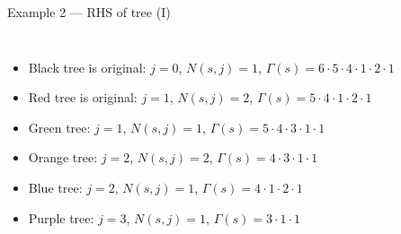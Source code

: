 \documentclass[serif]{beamer}
\begin{document}
\begin{frame}{Example 2 --- RHS of tree (I)}
  \begin{columns}[T]
  \vspace{0cm}
  \begin{itemize}
  \item<1-> Black tree is original: $j=0$, $N\left(s,j\right)=1$, $\Gamma\left(s\right) = 6\cdot5\cdot4\cdot1\cdot2\cdot1$
  \vspace{0.1cm}
  \item<1-> {\color{red} Red tree} is original: $j=1$, $N\left(s,j\right)=2$, $\Gamma\left(s\right) = 5\cdot4\cdot1\cdot2\cdot1$
  \vspace{0.1cm}
  \item<1-> {\color{green} Green tree}: $j=1$, $N\left(s,j\right)=1$, $\Gamma\left(s\right) = 5\cdot4\cdot3\cdot1\cdot1$
  \vspace{0.1cm}
  \item<1-> {\color{orange} Orange tree}: $j=2$, $N\left(s,j\right)=2$, $\Gamma\left(s\right) = 4\cdot3\cdot1\cdot1$
  \vspace{0.1cm}
  \item<1-> {\color{blue} Blue tree}: $j=2$, $N\left(s,j\right)=1$, $\Gamma\left(s\right) = 4\cdot1\cdot2\cdot1$
  \vspace{0.2cm}
  \item<1-> {\color{purple} Purple tree}: $j=3$, $N\left(s,j\right)=1$, $\Gamma\left(s\right) =3\cdot1\cdot1$
  \end{itemize}
  \vspace{-0.3cm} 
  \begin{center}
    \hspace{0.5cm}
   \\ \vspace{0.5cm}
  \scalebox{0.6}{
}
\end{center}
\end{columns}
\end{frame}
\end{document}

